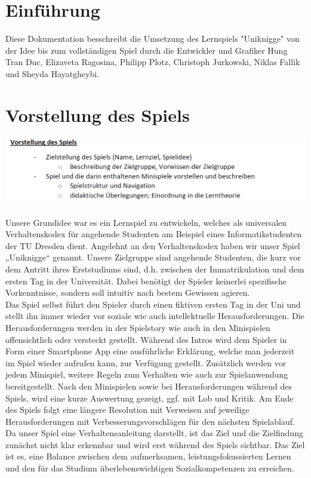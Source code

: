 \documentclass[a4paper, 11pt]{article} %
\begin{document}

\newpage
\renewcommand{\contentsname}{Inhaltsverzeichnis}
\tableofcontents

\newpage
\section{Einführung}
Diese Dokumentation besschreibt die Umsetzung des Lernspiels "Uniknigge" von der Idee bis zum vollständigen Spiel durch die Entwickler und Grafiker Hung Tran Duc, Elizaveta Ragosina, Philipp Plotz, Christoph Jurkowski, Niklas Fallik und Sheyda Hayatgheybi.

\section{Vorstellung des Spiels}
\includegraphics[scale=0.5]{images/vorstellung.png}\\\\
Unsere Grundidee war es ein Lernspiel zu entwickeln, welches als universalen Verhaltenskodex für angehende Studenten am Beispiel eines Informatikstudenten der TU Dresden dient. Angelehnt an den Verhaltenskodex haben wir unser Spiel „Uniknigge“ genannt. Unsere Zielgruppe sind angehende Studenten, die kurz vor dem Antritt ihres Erststudiums sind, d.h. zwischen der Immatrikulation und dem ersten Tag in der Universität. Dabei benötigt der Spieler keinerlei spezifische Vorkenntnisse, sondern soll intuitiv nach bestem Gewissen agieren. \\

Das Spiel selbst führt den Spieler durch einen fiktiven ersten Tag in der Uni und stellt ihn immer wieder vor soziale wie auch intellektuelle Herausforderungen. Die Herausforderungen werden in der Spielstory wie auch in den Minispielen offensichtlich oder versteckt gestellt. Während des Intros wird dem Spieler in Form einer Smartphone App eine ausführliche Erklärung, welche man jederzeit im Spiel wieder aufrufen kann, zur Verfügung gestellt. Zusätzlich werden vor jedem Minispiel, weitere Regeln zum Verhalten wie auch zur Spielanwendung bereitgestellt. Nach den Minispielen sowie bei Herausforderungen während des Spiels, wird eine kurze Auswertung gezeigt, ggf. mit Lob und Kritik. Am Ende des Spiels folgt eine längere Resolution mit Verweisen auf jeweilige Herausforderungen mit Verbesserungsvorschlägen für den nächsten Spielablauf. Da unser Spiel eine Verhaltensanleitung darstellt, ist das Ziel und die Zielfindung zunächst nicht klar erkennbar und wird erst während des Spiels sichtbar.
Das Ziel ist es, eine Balance zwischen dem aufmerksamen, leistungsfokussierten Lernen und den für das Studium überlebenswichtigen Sozialkompetenzen zu erreichen.
\end{document}
